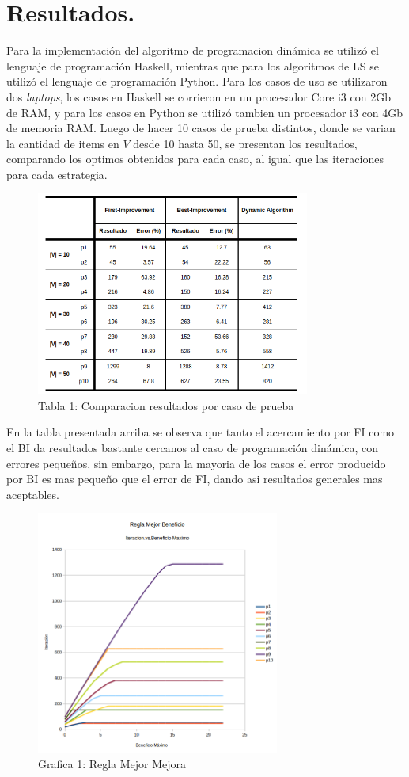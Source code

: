 \documentclass{ci5652}
\begin{document}
\section{Resultados.}
	Para la implementación del algoritmo de programacion dinámica se utilizó el lenguaje de programación Haskell, mientras que para los algoritmos de LS se utilizó el lenguaje de programación Python. Para los casos de uso se utilizaron dos \textit{laptops}, los casos en Haskell se corrieron en un procesador Core i3 con 2Gb de RAM, y para los casos en Python se utilizó tambien un procesador i3 con 4Gb de memoria RAM. Luego de hacer 10 casos de prueba distintos, donde se varian la cantidad de items en $V$ desde 10 hasta 50, se presentan los resultados, comparando los optimos obtenidos para cada caso, al igual que las iteraciones para cada estrategia.\\

 	\begin{figure}[h]
	 	\caption{Tabla 1: Comparacion resultados por caso de prueba}
		\includegraphics[width=9cm]{errores.png}
	\end{figure}

	En la tabla presentada arriba se observa que tanto el acercamiento por FI como el BI da resultados bastante cercanos al caso de programación dinámica, con errores pequeños, sin embargo, para la mayoria de los casos el error producido por BI es mas pequeño que el error de FI, dando asi resultados generales mas aceptables.\\

 	\begin{figure}[h]
 	\caption{Grafica 1: Regla Mejor Mejora}
	\includegraphics[width=8cm, height=8cm]{best_imp-it-vs-ben_max.png}
	\end{figure}
\end{document}
